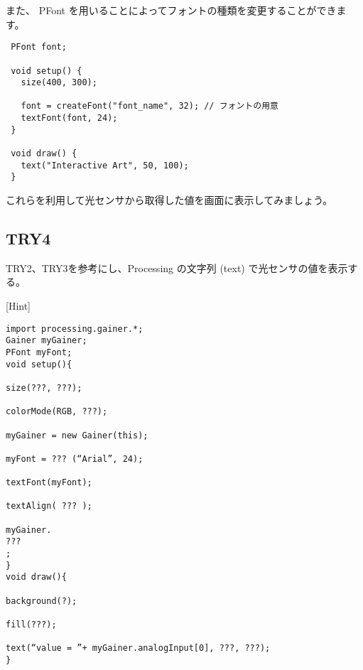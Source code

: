 \documentclass[11pt,a4paper]{jarticle}
\begin{document}
また、 PFont を用いることによってフォントの種類を変更することができます。
\begin{lstlisting}
 PFont font;

 void setup() {
   size(400, 300);
 
   font = createFont("font_name", 32); // フォントの用意
   textFont(font, 24);
 }

 void draw() {
   text("Interactive Art", 50, 100);
 }
\end{lstlisting}

これらを利用して光センサから取得した値を画面に表示してみましょう。


  
 

\subsection*{TRY4}
TRY2、TRY3を参考にし、Processing の文字列 (text) で光センサの値を表示する。

[Hint]
\begin{lstlisting}
import processing.gainer.*;
Gainer myGainer;
PFont myFont;
void setup(){
	
size(???, ???);
	
colorMode(RGB, ???);
	
myGainer = new Gainer(this);
	
myFont = ??? (“Arial”, 24);
	
textFont(myFont);
	
textAlign( ??? );
	
myGainer.
???
;
}
void draw(){
	
background(?);
	
fill(???);
	
text(“value = ”+ myGainer.analogInput[0], ???, ???);
}
 
\end{lstlisting}
\end{document}
